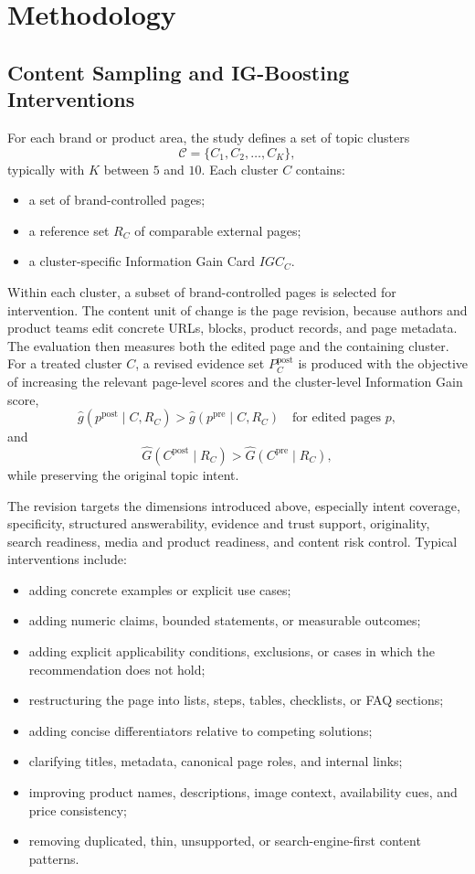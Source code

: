 \documentclass{article}
\begin{document}
\section{Methodology}

\subsection{Content Sampling and IG-Boosting Interventions}

For each brand or product area, the study defines a set of topic clusters
\[
\mathcal{C}=\{C_1,C_2,\dots,C_K\},
\]
typically with \(K\) between \(5\) and \(10\). Each cluster \(C\) contains:
\begin{itemize}
    \item a set of brand-controlled pages;
    \item a reference set \(R_C\) of comparable external pages;
    \item a cluster-specific Information Gain Card \(IGC_C\).
\end{itemize}

Within each cluster, a subset of brand-controlled pages is selected for intervention. The content unit of change is the page revision, because authors and product teams edit concrete URLs, blocks, product records, and page metadata. The evaluation then measures both the edited page and the containing cluster. For a treated cluster \(C\), a revised evidence set \(P_C^{\text{post}}\) is produced with the objective of increasing the relevant page-level scores and the cluster-level Information Gain score,
\[
\hat{g}(p^{\text{post}} \mid C,R_C) > \hat{g}(p^{\text{pre}} \mid C,R_C)
\quad\text{for edited pages }p,
\]
and
\[
\hat{G}(C^{\text{post}} \mid R_C) > \hat{G}(C^{\text{pre}} \mid R_C),
\]
while preserving the original topic intent.

The revision targets the dimensions introduced above, especially intent coverage, specificity, structured answerability, evidence and trust support, originality, search readiness, media and product readiness, and content risk control. Typical interventions include:
\begin{itemize}
    \item adding concrete examples or explicit use cases;
    \item adding numeric claims, bounded statements, or measurable outcomes;
    \item adding explicit applicability conditions, exclusions, or cases in which the recommendation does not hold;
    \item restructuring the page into lists, steps, tables, checklists, or FAQ sections;
    \item adding concise differentiators relative to competing solutions;
    \item clarifying titles, metadata, canonical page roles, and internal links;
    \item improving product names, descriptions, image context, availability cues, and price consistency;
    \item removing duplicated, thin, unsupported, or search-engine-first content patterns.
\end{itemize}
\end{document}
